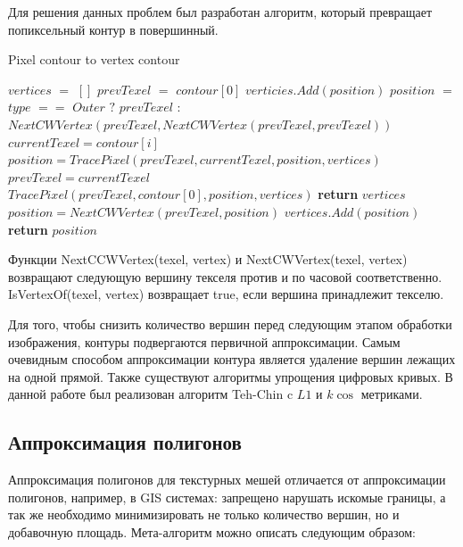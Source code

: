 \documentclass{fefu_thesis/cls/fefu}
\newenvironment{algo}[1][]
  {\begin{algorithm}[#1]
     \selectlanguage{english}
     \floatname{algorithm}{Алгоритм}
  }
  {\end{algorithm}}
\begin{document}
    Для решения данных проблем был разработан алгоритм, который превращает попиксельный контур в повершинный.
    \begin{algo}[H]
        \caption{Pixel contour to vertex contour}
        \begin{algorithmic}[1]
                \State $vertices$ $=$ $[]$
                \State $prevTexel$ $=$ $contour$$[0]$
                    \State $verticies.Add(position)$
                \EndIf
                \State $position$ $=$ $type$ $==$ $Outer$ $?$
                \State $prevTexel$ $:$
                \State $NextCWVertex(prevTexel, NextCWVertex(prevTexel, prevTexel))$
                    \State $currentTexel = contour[i]$
                    \State $position = TracePixel(prevTexel, currentTexel, position, vertices)$
                    \State $prevTexel = currentTexel$
                \EndFor
                \State $TracePixel(prevTexel, contour[0], position, vertices)$
                \State \textbf{return} $vertices$
            \EndProcedure
                \Do
                    \State $position = NextCWVertex(prevTexel, position)$
                    \State $vertices.Add(position)$
                \State \textbf{return} $position$
            \EndProcedure
        \end{algorithmic}
    \end{algo}

    Функции NextCCWVertex(texel, vertex) и NextCWVertex(texel, vertex) возвращают следующую вершину текселя против и по часовой соответственно. IsVertexOf(texel, vertex) возвращает true, если вершина принадлежит текселю.

    Для того, чтобы снизить количество вершин перед следующим этапом обработки изображения, контуры подвергаются первичной аппроксимации. Самым очевидным способом аппроксимации контура является удаление вершин лежащих на одной прямой. Также существуют алгоритмы упрощения цифровых кривых. В данной работе был реализован алгоритм Teh-Chin\cite{TehChin} c $L1$ и $k\cos$ метриками.

    \subsection{Аппроксимация полигонов}
    \label{PolygonApproximation}
    Аппроксимация полигонов для текстурных мешей отличается от аппроксимации полигонов, например, в GIS системах: запрещено нарушать искомые границы, а так же необходимо минимизировать не только количество вершин, но и добавочную площадь. Мета-алгоритм можно описать следующим образом:
\end{document}
